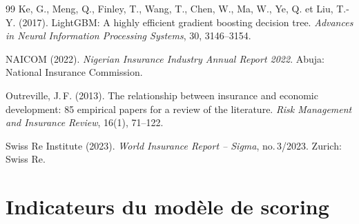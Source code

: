 \documentclass[12pt,a4paper]{report}
\begin{document}
\begin{thebibliography}{99}
Ke, G., Meng, Q., Finley, T., Wang, T., Chen, W., Ma, W., Ye, Q. et Liu, T.-Y. (2017).
\newblock LightGBM: A highly efficient gradient boosting decision tree.
\newblock \emph{Advances in Neural Information Processing Systems}, 30, 3146--3154.

NAICOM (2022).
\newblock \emph{Nigerian Insurance Industry Annual Report 2022}.
\newblock Abuja: National Insurance Commission.

Outreville, J.\,F. (2013).
\newblock The relationship between insurance and economic development:
  85 empirical papers for a review of the literature.
\newblock \emph{Risk Management and Insurance Review}, 16(1), 71--122.

Swiss Re Institute (2023).
\newblock \emph{World Insurance Report -- Sigma}, no.\,3/2023.
\newblock Zurich: Swiss Re.

\end{thebibliography}

\clearpage

\appendix

\chapter{Indicateurs du modèle de scoring}
\label{ann:indicateurs}
\end{document}
